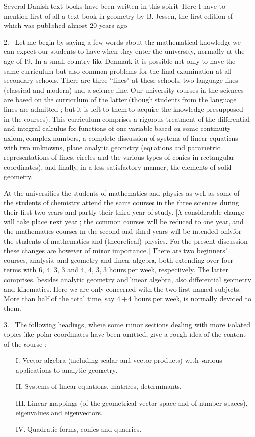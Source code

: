 Several Danish text books have been written in this spirit. Here I
have to mention first of all a text book in geometry by B. Jessen, the
first edition of which was published almost 20 years ago.

2.~ Let me begin by saying a few words about the mathematical
knowledge we can expect our students to have when they enter the
university, normally at the age of 19. In a small country like Denmark
it is possible not only to have the same curriculum but also common
problems for the final examination at all secondary schools. There are
three ``lines'' at these schools, two language lines (classical and
modern) and a science line. Our university courses in the sciences are
based on the curriculum of the latter (though students from the
language lines are admitted ; but it is left to them to acquire the
knowledge presupposed in the courses). This curriculum comprises a
rigorous treatment  of the differential and integral calculus for
functions of one variable based on some continuity axiom, complex
numbers, a complete discussion of systems of linear equations with two
unknowns, plane analytic geometry (equations and parametric
representations of lines, circles and the various types of conics in
rectangular coordinates), and finally, in a less satisfactory manner,
the elements of solid geometry.

At the universities the students of mathematics and physics as well as
some of the students of chemistry attend the same courses in the three
sciences during their first two years and partly their third year of
study. [A considerable change will take place next year ; the common
  courses will be reduced to one year, and the mathematics courses in
  the second and third years will be intended only\pageoriginale for
  the students of mathematics and (theoretical) physics. For the
  present discussion these changes are however of minor importance.]
There are two beginners' courses, analysis, and geometry and linear
algebra, both extending over four terms with 6, 4, 3, 3 and 4, 4, 3, 3
hours per week, respectively. The latter comprises, besides analytic
geometry and linear algebra, also differential geometry and
kinematics. Here we are only concerned with the two first named
subjects. More than half of the total time, say  $4+4$ hours per week,
is normally  devoted to them.

3.~ The following headings, where some minor sections dealing with
more isolated topics like polar coordinates have been omitted, give a
rough idea of the content of the course :
\begin{itemize}
\item[{I.}] Vector algebra (including scalar and vector products) with
  various applications to analytic geometry.

\item[{II.}] Systems of linear equations, matrices, determinants.
 
\item[{III.}] Linear mappings (of the geometrical vector space and of
  number spaces), eigenvalues and eigenvectors.

\item[{IV.}] Quadratic forms, conics and quadrics.
\end{itemize}

